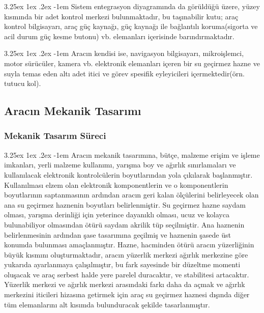 \documentclass[12pt]{article}
\makeatletter
\renewcommand\paragraph{\@startsection{paragraph}{5}{\z@}%
  {3.25ex \@plus1ex \@minus.2ex}%
  {-1em}%
  {\normalfont\normalsize\bfseries}}
\makeatother
\begin{document}
\paragraph{} Sistem entegrasyon diyagramında da görüldüğü üzere, yüzey kısmında bir adet kontrol merkezi bulunmaktadır, bu taşınabilir kutu; araç kontrol bilgisayarı, araç güç kaynağı, güç kaynağı ile bağlantılı koruma(sigorta ve acil durum güç kesme butonu) vb. elemanları içerisinde barındırmaktadır. 

\paragraph{} Aracın kendisi ise, navigasyon bilgisayarı, mikroişlemci, motor sürücüler, kamera vb. elektronik elemanları içeren bir su geçirmez hazne ve suyla temas eden altı adet itici ve görev spesifik eyleyicileri içermektedir(örn. tutucu kol).

\subsection{Aracın Mekanik Tasarımı}

\subsubsection{Mekanik Tasarım Süreci}

\paragraph{} Aracın mekanik tasarımına, bütçe, malzeme erişim  ve işleme imkanları, yerli malzeme kullanımı, yarışma boy ve ağırlık sınırlamaları ve kullanılacak elektronik kontrolcülerin boyutlarından yola çıkılarak başlanmıştır. Kullanılması elzem olan elektronik komponentlerin ve o komponentlerin boyutlarının saptanmasının ardından aracın geri kalan ölçülerini belirleyecek olan ana su geçirmez haznenin boyutları belirlenmiştir. Su geçirmez hazne saydam olması, yarışma derinliği için yeterince dayanıklı olması, ucuz ve kolayca bulunabiliyor olmasından ötürü saydam akrilik tüp seçilmiştir. Ana haznenin belirlenmesinin ardından şase tasarımına geçilmiş ve haznenin şasede üst konumda bulunması amaçlanmıştır. Hazne, hacminden ötürü aracın yüzerliğinin büyük kısmını oluşturmaktadır, aracın yüzerlik merkezi ağırlık merkezine göre yukarıda ayarlanmaya çalışılmıştır, bu fark sayesinde bir düzeltme momenti oluşacak ve araç serbest halde yere parelel duracaktır, ve stabilitesi artacaktır.\cite{BOOK:rovmanual} Yüzerlik merkezi ve ağırlık merkezi arasındaki farkı daha da açmak ve ağırlık merkezini iticileri hizasına getirmek için araç su geçirmez haznesi dışında diğer tüm elemanlarını alt kısımda bulunduracak şekilde tasarlanmıştır.
\end{document}
